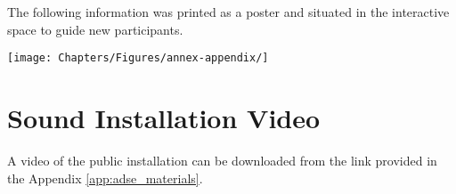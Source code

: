 The following information was printed as a poster and situated in the interactive space to guide new participants.

\texttt{[image: Chapters/Figures/annex-appendix/]}
\label{fig:asde_poster}

\section*{Sound Installation Video}

A video of the public installation can be downloaded from the link provided in the Appendix \ref{app:adse_materials}.



